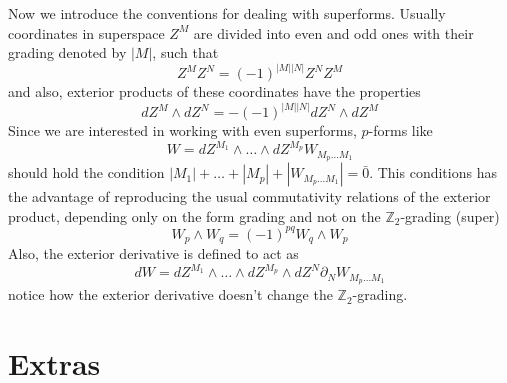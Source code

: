 \documentclass[a4paper,12pt]{article}
\numberwithin{equation}{section}
\numberwithin{thm}{section}
\numberwithin{exm}{section}
\newcommand{\p}{\partial}
\newcommand{\Z}{{\mathbb Z}}
\newcommand{\we}{{\wedge}}
\newcommand{\<}{{\langle}}
\renewcommand{\>}{{\rangle}}
\begin{document}
Now we introduce the conventions for dealing with superforms. Usually coordinates in superspace $Z^M$ are divided into even and odd ones with their grading denoted by $|M|$, such that
	\begin{equation}
	Z^M Z^N = (-1)^{|M||N|} Z^N Z^M
	\end{equation}
and also, exterior products of these coordinates have the properties
	\begin{equation}
	dZ^M \we dZ^N = - (-1)^{|M||N|} dZ^N \we dZ^M
	\end{equation}
Since we are interested in working with even superforms, $p$-forms like
	\begin{equation}
	W = dZ^{M_1} \we \ldots \we dZ^{M_p} W_{M_p\ldots M_1}
	\end{equation}
should hold the condition $|M_1|+ \ldots + |M_p| + |W_{M_p\ldots M_1}| = \bar 0 $. This conditions has the advantage of reproducing the usual commutativity relations of the exterior product, depending only on the form grading and not on the $\Z_2$-grading (super)
	\begin{equation}
	W_{p} \we W_{q} = (-1)^{pq} W_{q}\we W_{p}
	\end{equation}
Also, the exterior derivative is defined to act as
	\begin{equation}
	d W = dZ^{M_1}\we\ldots \we dZ^{M_p}\we dZ^{N} \p_N  W_{M_p\ldots M_1}
	\end{equation}
notice how the exterior derivative doesn't change the $\Z_2$-grading.



\section{Extras}
\end{document}

